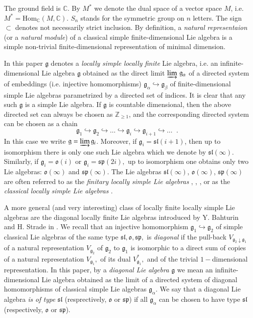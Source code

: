 \documentclass{svmult}
\newcommand {\ZZ} {\mathbb {Z}}
\newcommand {\CC} {\mathbb {C}}
\renewcommand{\sp}{\mathfrak{sp}}
\renewcommand{\sl}{\mathfrak{sl}}
\newcommand{\oo}{\mathfrak{o}}
\renewcommand{\gg}{\mathfrak{g}}
\begin{document}
The ground field is $\CC$. By $M^*$ we denote the dual space of a vector space $M$, i.e. $M^* = \mathrm{Hom}_{\CC}(M,\CC)$. $S_n$ stands for the symmetric group on $n$ letters. The sign $\subset$ denotes not necessarily strict inclusion. By definition, a \textit{natural representaion} (or a \textit{natural module}) of a classical simple finite-dimensional Lie algebra is a simple non-trivial finite-dimensional representation of minimal dimension.

In this paper $\gg$ denotes a \textit{locally simple locally finite} Lie algebra, i.e. an infinite-dimensional Lie algebra $\gg$ 
obtained as the direct limit $\varinjlim\,\gg_\alpha$ of a directed system of embeddings (i.e. injective homomorphisms) $\gg_\alpha \hookrightarrow\gg_\beta$
of finite-dimensional simple Lie algebras parametrized by a directed set of indices. It is clear that any such $\gg$ is a simple Lie algebra.
If $\gg$ is countable dimensional, then the above directed set can always be chosen as $\ZZ_{\geq 1}$, and the corresponding directed system can be chosen as a chain 
\begin{equation}\label{def_gg}
 \gg_1 \hookrightarrow \gg_2 \hookrightarrow \dots \hookrightarrow \gg_i \hookrightarrow \gg_{i+1} \hookrightarrow \dots\;\;.
\end{equation}
In this case we write
$\gg=\varinjlim \gg_i$. Moreover, if $\gg_i = \sl(i+1)$, then up to isomorphism there is only one such Lie algebra which we denote by $\sl(\infty)$. Similarly, if $\gg_i = \oo(i)$ or $\gg_i = \sp(2i),$ up to isomorphism one obtains only two Lie algebras: $\oo(\infty)$ and $\sp(\infty)$. The Lie algebras $\sl(\infty)$,  $\oo(\infty)$,  $\sp(\infty)$ are often referred to as the \textit{finitary locally simple Lie algebras} \cite{BA1}, \cite{BA2}, \cite{BS}, or as the \textit{classical locally simple Lie algebras} \cite{ps}. 

A more general (and very interesting) class of locally finite locally simple  Lie algebras are the diagonal locally finite Lie algebras introduced by Y. Bahturin and H. Strade in \cite{BHS}.
We recall that an injective homomorphism $\gg_1 \hookrightarrow \gg_2$ of simple classical Lie algebras of the same type $\sl, \oo, \sp,$ is \textit{diagonal} if the pull-back $V_{\gg_2\downarrow\gg_1}$ of a natural representation $V_{\gg_2}$ of $\gg_2$ to $\gg_1$ is isomorphic to a direct sum of copies of a natural representation $V_{\gg_1},$ of its dual $V_{\gg_1}^*,$ and of the trivial $1-$dimensional representation. In this paper, by a \textit{diagonal Lie algebra $\gg$} we mean an infinite-dimensional Lie 
algebra obtained as the limit of a directed system of diagonal homomorphisms of classical simple Lie algebras $\gg_\alpha$. We say that a diagonal Lie algebra \textit{is of type} $\sl$ (resprectively, $\oo$ or $\sp$) if all $\gg_\alpha$ can be chosen to have type $\sl$ (respectively, $\oo$ or $\sp$). 
\end{document}
